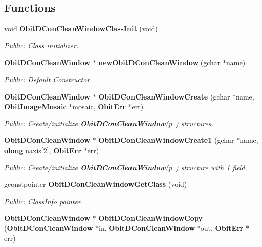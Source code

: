 \subsection*{Functions}
\begin{CompactItemize}
\item 
void {\bf Obit\-DCon\-Clean\-Window\-Class\-Init} (void)
\begin{CompactList}\small\item\em Public: Class initializer. \item\end{CompactList}\item 
{\bf Obit\-DCon\-Clean\-Window} $\ast$ {\bf new\-Obit\-DCon\-Clean\-Window} (gchar $\ast$name)
\begin{CompactList}\small\item\em Public: Default Constructor. \item\end{CompactList}\item 
{\bf Obit\-DCon\-Clean\-Window} $\ast$ {\bf Obit\-DCon\-Clean\-Window\-Create} (gchar $\ast$name, {\bf Obit\-Image\-Mosaic} $\ast$mosaic, {\bf Obit\-Err} $\ast$err)
\begin{CompactList}\small\item\em Public: Create/initialize {\bf Obit\-DCon\-Clean\-Window}{\rm (p.\,\pageref{structObitDConCleanWindow})} structures. \item\end{CompactList}\item 
{\bf Obit\-DCon\-Clean\-Window} $\ast$ {\bf Obit\-DCon\-Clean\-Window\-Create1} (gchar $\ast$name, {\bf olong} naxis[2], {\bf Obit\-Err} $\ast$err)
\begin{CompactList}\small\item\em Public: Create/initialize {\bf Obit\-DCon\-Clean\-Window}{\rm (p.\,\pageref{structObitDConCleanWindow})} structure with 1 field. \item\end{CompactList}\item 
gconstpointer {\bf Obit\-DCon\-Clean\-Window\-Get\-Class} (void)
\begin{CompactList}\small\item\em Public: Class\-Info pointer. \item\end{CompactList}\item 
{\bf Obit\-DCon\-Clean\-Window} $\ast$ {\bf Obit\-DCon\-Clean\-Window\-Copy} ({\bf Obit\-DCon\-Clean\-Window} $\ast$in, {\bf Obit\-DCon\-Clean\-Window} $\ast$out, {\bf Obit\-Err} $\ast$err)

\end{CompactItemize}
